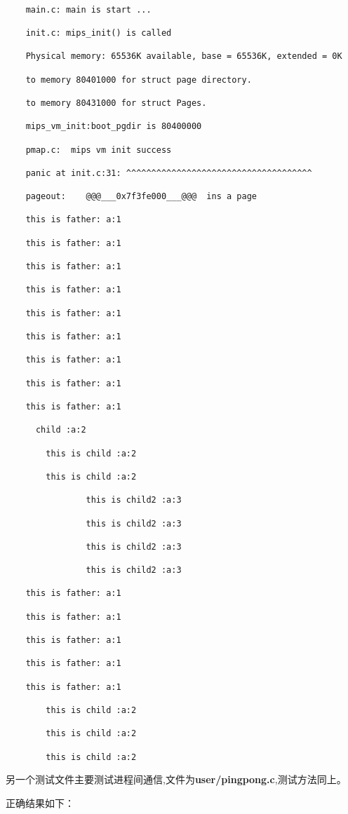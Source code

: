 \begin{verbatim}

	main.c:	main is start ...

	init.c:	mips_init() is called

	Physical memory: 65536K available, base = 65536K, extended = 0K

	to memory 80401000 for struct page directory.

	to memory 80431000 for struct Pages.

	mips_vm_init:boot_pgdir is 80400000

	pmap.c:	 mips vm init success

	panic at init.c:31: ^^^^^^^^^^^^^^^^^^^^^^^^^^^^^^^^^^^^^

	pageout:	@@@___0x7f3fe000___@@@  ins a page

	this is father: a:1

	this is father: a:1

	this is father: a:1

	this is father: a:1

	this is father: a:1

	this is father: a:1

	this is father: a:1

	this is father: a:1

	this is father: a:1

	  child :a:2

		this is child :a:2

		this is child :a:2

				this is child2 :a:3

				this is child2 :a:3

				this is child2 :a:3

				this is child2 :a:3

	this is father: a:1

	this is father: a:1

	this is father: a:1

	this is father: a:1

	this is father: a:1

		this is child :a:2

		this is child :a:2

		this is child :a:2
\end{verbatim}

另一个测试文件主要测试进程间通信,文件为\textbf{user/pingpong.c},测试方法同上。

正确结果如下：

